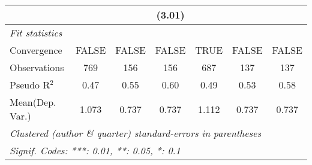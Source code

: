 \begin{tabular}{lcccccc}
                           &             &        & (3.01)       &            &             &   \\   
   \midrule
   \emph{Fit statistics}\\
   Convergence             &FALSE        & FALSE  & FALSE        & TRUE       & FALSE       & FALSE\\  
   Observations            & 769         & 156    & 156          & 687        & 137         & 137\\  
   Pseudo R$^2$            & 0.47        & 0.55   & 0.60         & 0.49       & 0.53        & 0.58\\  
Mean(Dep. Var.) & 1.073 & 0.737 & 0.737 & 1.112 & 0.737 & 0.737 \\
   \midrule \midrule
   \multicolumn{7}{l}{\emph{Clustered (author \& quarter) standard-errors in parentheses}}\\
   \multicolumn{7}{l}{\emph{Signif. Codes: ***: 0.01, **: 0.05, *: 0.1}}\\
\end{tabular}
\par\endgroup

